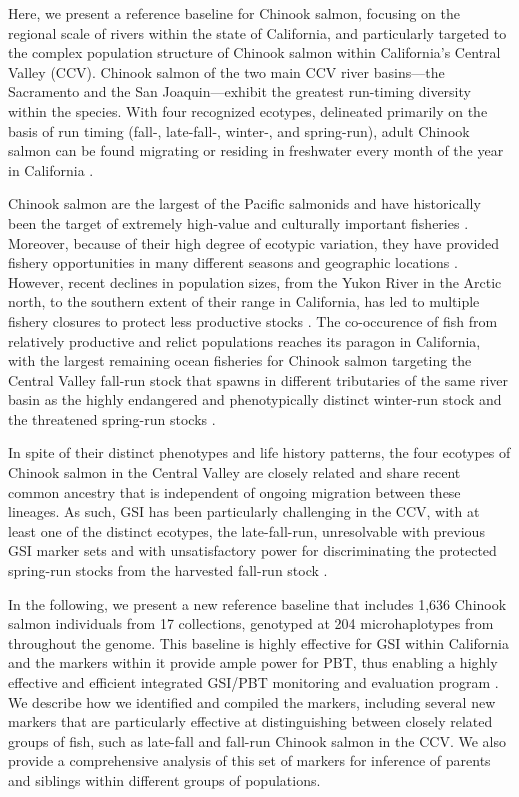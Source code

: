 Here, we present a reference baseline for Chinook salmon, focusing on the regional scale of
rivers within the state of California, and particularly targeted to the complex population
structure of Chinook salmon within California's Central Valley (CCV). Chinook salmon of the two main CCV river basins---the
Sacramento and the San Joaquin---exhibit the greatest run-timing diversity
within the species.  With four recognized ecotypes, delineated primarily on the basis of run timing
(fall-, late-fall-, winter-, and spring-run), adult Chinook salmon can be found migrating or residing
in freshwater every month of the year in California \citep{fisher1994past}.

Chinook salmon are the largest of the Pacific salmonids and have historically been the target of extremely high-value and culturally important
fisheries \citep{myers1998status}. Moreover, because of their high degree of ecotypic variation, they have provided fishery opportunities in many
different seasons and geographic locations \citep{healey1991life}. However, recent declines in population sizes, from the Yukon River in the Arctic north,
to the southern extent of their range in California, has led to multiple fishery closures to protect
less productive stocks \citep{lindley2009caused}. The co-occurence of fish from relatively productive and relict populations reaches its paragon in California,
with the largest remaining ocean fisheries for Chinook salmon targeting the Central Valley fall-run stock that spawns in different tributaries of the
same river basin as the highly endangered and phenotypically distinct winter-run stock and the threatened spring-run stocks \citep{satterthwaite2015stock}.

In spite of their distinct phenotypes and life history patterns, the four ecotypes of Chinook salmon in the Central Valley are closely related
\citep{clemento2014evaluation} and share recent common ancestry that is independent of ongoing migration between these lineages. As such, GSI
has been particularly challenging in the CCV, with at least one of the distinct ecotypes, the late-fall-run, unresolvable with previous GSI marker sets
and with unsatisfactory power for discriminating the protected spring-run stocks from the
harvested fall-run stock \citep{seeb2007development,clemento2014evaluation}.

In the following, we present a new reference baseline that includes 1,636 Chinook salmon individuals
from 17 collections, genotyped at 204 microhaplotypes \citep{baetscher2018microhaplotypes} from throughout the genome.
This baseline is
highly effective for GSI within California and the markers within it provide ample power
for PBT, thus enabling a highly effective and efficient integrated GSI/PBT monitoring and evaluation program 
\citep{garza2007large,beacham2021parentage}.
We describe how we identified and compiled the markers, including several new markers
that are particularly effective at distinguishing between closely related groups of fish,
such as late-fall and fall-run Chinook salmon in the CCV.  We also provide a comprehensive analysis of this
set of markers for inference of parents and siblings within different groups of populations.



